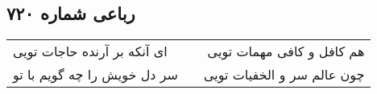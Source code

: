 \begin{center}
\section*{رباعی شماره ۷۲۰}
\label{sec:sh720}
\begin{longtable}{l p{0.5cm} r}
ای آنکه بر آرنده حاجات تویی
&&
هم کافل و کافی مهمات تویی
\\
سر دل خویش را چه گویم با تو
&&
چون عالم سر و الخفیات تویی
\\
\end{longtable}
\end{center}
